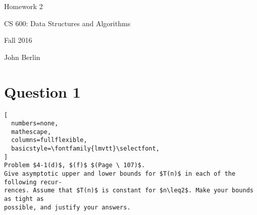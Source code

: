\documentclass{article}
\begin{document}
\begin{titlepage}

\begin{center}

\Huge{Homework 2}

\Large{CS 600:  Data Structures and Algorithms }

\Large{Fall 2016}

\Large{John Berlin}



\end{center}

\end{titlepage}
\section*{Question 1}
\begin{lstlisting}[
  numbers=none,
  mathescape,
  columns=fullflexible,
  basicstyle=\fontfamily{lmvtt}\selectfont,
]
Problem $4-1(d)$, $(f)$ $(Page \ 107)$.
Give asymptotic upper and lower bounds for $T(n)$ in each of the following recur-
rences. Assume that $T(n)$ is constant for $n\leq2$. Make your bounds as tight as
possible, and justify your answers.
\end{lstlisting}
\end{document}
